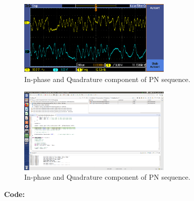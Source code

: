 \documentclass{article}
\begin{document}
\begin{figure}[h]
  \begin{center}
    \includegraphics[width=0.65\textwidth]{img/task_e_oscilloscope.png}
    \caption{In-phase and Quadrature component of PN sequence.}
  \end{center}
\end{figure}

\begin{figure}[h]
  \begin{center}
    \includegraphics[width=0.65\textwidth]{img/task_e_profile.png}
    \caption{In-phase and Quadrature component of PN sequence.}
  \end{center}
\end{figure}

\pagebreak
\textbf{Code:}
\end{document}
